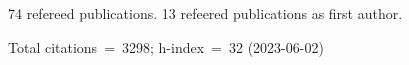 74 refereed publications. 13 refeered publications as first author.

Total citations~=~3298; h-index~=~32 (2023-06-02)